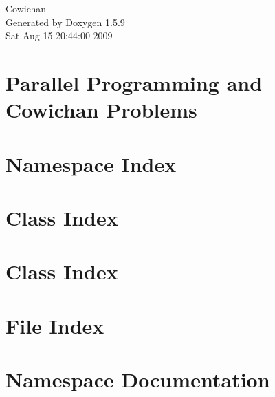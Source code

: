 \documentclass[a4paper]{book}
\begin{document}
\hypersetup{pageanchor=false}
\begin{titlepage}
\vspace*{7cm}
\begin{center}
{\Large Cowichan }\\
\vspace*{1cm}
{\large Generated by Doxygen 1.5.9}\\
\vspace*{0.5cm}
{\small Sat Aug 15 20:44:00 2009}\\
\end{center}
\end{titlepage}
\clearemptydoublepage
{}
\tableofcontents
\clearemptydoublepage
{}
\hypersetup{pageanchor=true}
\chapter{Parallel Programming and Cowichan Problems}
\label{index}\hypertarget{index}{}
\chapter{Namespace Index}

\chapter{Class Index}

\chapter{Class Index}

\chapter{File Index}

\chapter{Namespace Documentation}




\end{document}
